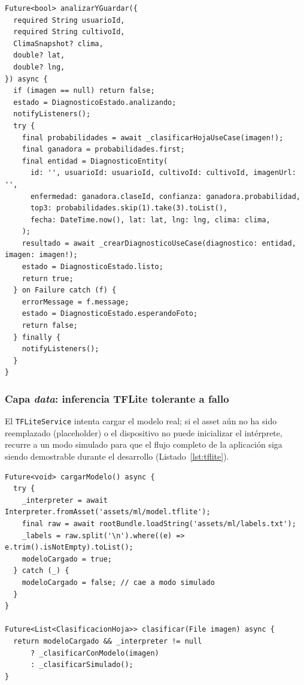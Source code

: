 \documentclass[12pt,a4paper]{article}
\begin{document}
\begin{lstlisting}[caption={Fragmento del ViewModel de diagnóstico}, label={lst:viewmodel}]
Future<bool> analizarYGuardar({
  required String usuarioId,
  required String cultivoId,
  ClimaSnapshot? clima,
  double? lat,
  double? lng,
}) async {
  if (imagen == null) return false;
  estado = DiagnosticoEstado.analizando;
  notifyListeners();
  try {
    final probabilidades = await _clasificarHojaUseCase(imagen!);
    final ganadora = probabilidades.first;
    final entidad = DiagnosticoEntity(
      id: '', usuarioId: usuarioId, cultivoId: cultivoId, imagenUrl: '',
      enfermedad: ganadora.claseId, confianza: ganadora.probabilidad,
      top3: probabilidades.skip(1).take(3).toList(),
      fecha: DateTime.now(), lat: lat, lng: lng, clima: clima,
    );
    resultado = await _crearDiagnosticoUseCase(diagnostico: entidad, imagen: imagen!);
    estado = DiagnosticoEstado.listo;
    return true;
  } on Failure catch (f) {
    errorMessage = f.message;
    estado = DiagnosticoEstado.esperandoFoto;
    return false;
  } finally {
    notifyListeners();
  }
}
\end{lstlisting}

\subsubsection{Capa \textit{data}: inferencia TFLite tolerante a fallo}

El \texttt{TFLiteService} intenta cargar el modelo real; si el asset aún no ha
sido reemplazado (placeholder) o el dispositivo no puede inicializar el
intérprete, recurre a un modo simulado para que el flujo completo de la
aplicación siga siendo demostrable durante el desarrollo (Listado~\ref{lst:tflite}).

\begin{lstlisting}[caption={Carga tolerante a fallo del modelo TFLite}, label={lst:tflite}]
Future<void> cargarModelo() async {
  try {
    _interpreter = await Interpreter.fromAsset('assets/ml/model.tflite');
    final raw = await rootBundle.loadString('assets/ml/labels.txt');
    _labels = raw.split('\n').where((e) => e.trim().isNotEmpty).toList();
    modeloCargado = true;
  } catch (_) {
    modeloCargado = false; // cae a modo simulado
  }
}

Future<List<ClasificacionHoja>> clasificar(File imagen) async {
  return modeloCargado && _interpreter != null
      ? _clasificarConModelo(imagen)
      : _clasificarSimulado();
}
\end{lstlisting}
\end{document}

